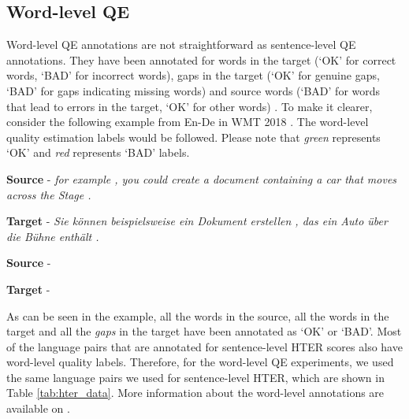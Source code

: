 \subsection{Word-level QE}
Word-level QE annotations are not straightforward as sentence-level QE annotations. They have been annotated for words in the target (`OK' for correct words, `BAD' for incorrect words), gaps in the target (`OK' for genuine gaps, `BAD' for gaps indicating missing words) and source words (`BAD' for words that lead to errors in the target, `OK' for other words) \autocite{specia-etal-2018-findings}. To make it clearer, consider the following example from En-De in WMT 2018 \autocite{specia-etal-2018-findings}. The word-level quality estimation labels would be followed. Please note that \textit{green} represents `OK' and \textit{red} represents `BAD' labels. 


\noindent \textbf{Source} - \textit{for example , you could create a document containing a car that moves across the Stage .}

\noindent \textbf{Target} - \textit{Sie können beispielsweise ein Dokument erstellen , das ein Auto über die Bühne enthält .}


\noindent \textbf{Source} - \textit{  \hlgreen{,}              }



\noindent \textbf{Target} - \textit{             \hlgreen{,}                 }


As can be seen in the example, all the words in the source, all the words in the target and all the \textit{gaps} in the target have been annotated as `OK' or `BAD'.  Most of the language pairs that are annotated for sentence-level HTER scores also have word-level quality labels. Therefore, for the word-level QE experiments, we used the same language pairs we used for sentence-level HTER, which are shown in Table \ref{tab:hter_data}. More information about the word-level annotations are available on \autocite{specia-etal-2018-findings,fonseca-etal-2019-findings,specia-etal-2020-findings-wmt}.


